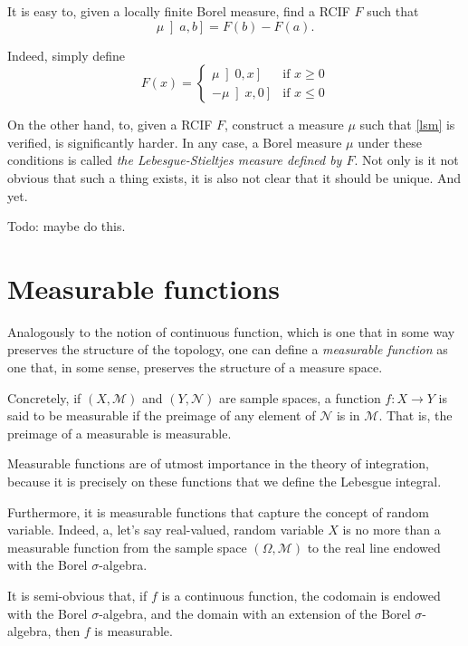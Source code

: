 \documentclass{article}
\theoremstyle{definition}
\newcommand{\M}{\mathcal{M}}
\newcommand{\CN}{\mathcal{N}}
\begin{document}
	It is easy to, given a locally finite Borel measure, find a RCIF $F$ such that
	\begin{equation}\label{lsm}\mu \left]a, b\right] = F(b) - F(a).\end{equation}
	
	Indeed, simply define
	\[
	F(x) = \begin{cases}
	\mu \left]0, x \right] & \text{if $x \geq 0$}\\
	-\mu \left]x, 0\right] & \text{if $x \leq 0$}
	\end{cases}
	\]
	
	On the other hand, to, given a RCIF $F$, construct a measure $\mu$ such that \eqref{lsm} is verified, is significantly harder. In any case, a Borel measure $\mu$ under these conditions is called \emph{the Lebesgue-Stieltjes measure defined by $F$}. Not only is it not obvious that such a thing exists, it is also not clear that it should be unique. And yet.
	
	Todo: maybe do this.
	
	\section{Measurable functions}
	
	Analogously to the notion of continuous function, which is one that in some way preserves the structure of the topology, one can define a \emph{measurable function} as one that, in some sense, preserves the structure of a measure space.
	
	Concretely, if $(X, \M)$ and $(Y, \CN)$ are sample spaces, a function $f : X \to Y$ is said to be measurable if the preimage of any element of $\CN$ is in $\M$. That is, the preimage of a measurable is measurable.
	
	Measurable functions are of utmost importance in the theory of integration, because it is precisely on these functions that we define the Lebesgue integral.
	
	Furthermore, it is measurable functions that capture the concept of random variable. Indeed, a, let's say real-valued, random variable $X$ is no more than a measurable function from the sample space $(\Omega, \M)$ to the real line endowed with the Borel $\sigma$-algebra.
	
	It is semi-obvious that, if $f$ is a continuous function, the codomain is endowed with the Borel $\sigma$-algebra, and the domain with an extension of the Borel $\sigma$-algebra, then $f$ is measurable.
	
\end{document}
